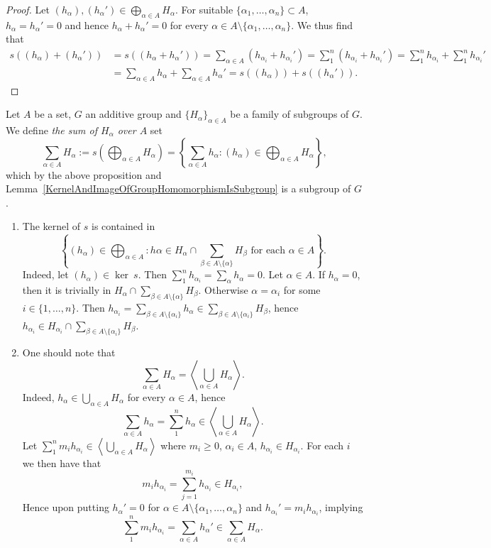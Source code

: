 \begin{proof}
    Let $(h_\alpha),(h_\alpha')\in \bigoplus_{\alpha\in A} H_\alpha$.
    For suitable $\{\alpha_1,\dots,\alpha_n\}\subset A$, $h_\alpha = h_\alpha'=0$ and hence $h_\alpha+h_\alpha' = 0$ for every $\alpha\in A\setminus \{\alpha_1,\dots,\alpha_n\}$. We thus find that
    \begin{align*}
        s((h_\alpha)+(h_\alpha')) &= s((h_\alpha+h_\alpha'))= \sum_{\alpha\in A}\left( h_{\alpha_i} + h_{\alpha_i}'\right) = \sum_1^n\left( h_{\alpha_i} + h_{\alpha_i}'\right)
        = \sum_1^n h_{\alpha_i} +\sum_1^n h_{\alpha_i}'\\
        &= \sum_{\alpha \in A} h_\alpha + \sum_{\alpha\in A} h_\alpha' = s((h_\alpha)) + s((h_\alpha')).
    \end{align*}
\end{proof}
\begin{definition}
    Let $A$ be a set, $G$ an additive group and $\{H_\alpha\}_{\alpha\in A}$ be a family of subgroups of $G$. We define \textit{the sum of $H_\alpha$ over $A$} set 
    $$\sum_{\alpha \in A} H_\alpha := s\left(\bigoplus_{\alpha\in A} H_\alpha\right) =  \left\{ \sum_{\alpha\in A} h_\alpha : (h_\alpha)\in \bigoplus_{\alpha\in A} H_\alpha \right\},$$
    which by the above proposition and Lemma~\ref{KernelAndImageOfGroupHomomorphismIsSubgroup} is a subgroup of $G$. 
\end{definition}
\begin{remark}\label{SumOfSubgroupsIsSubgroupGeneratedByUnion}
    \begin{enumerate}
    \item The kernel of $s$ is contained in 
    $$\left\{ (h_\alpha)\in \bigoplus_{\alpha\in A} : h\alpha \in H_\alpha \cap \sum_{\beta\in A\setminus\{\alpha\}} H_\beta \text{ for each } \alpha\in A\right\}.$$
    Indeed, let $(h_\alpha)\in \ker \ s$. Then $\sum_1^n h_{\alpha_i} = \sum_{\alpha} h_\alpha = 0$. Let $\alpha \in A$. If $h_\alpha =0$, then it is trivially in $H_\alpha \cap \sum_{\beta\in A\setminus\{\alpha\}} H_\beta$. Otherwise $\alpha = \alpha_i$ for some $i\in\{1,\dots,n\}$. Then $h_{\alpha_i}=\sum_{\beta\in A\setminus \{\alpha_i\}} h_\alpha \in \sum_{\beta\in A\setminus\{\alpha_i\}} H_\beta$, hence $h_{\alpha_i}\in H_{\alpha_i}\cap \sum_{\beta\in A\setminus\{\alpha_i\}} H_\beta$.
    \item One should note that $$\sum_{\alpha\in A} H_\alpha = \left\langle \bigcup_{\alpha\in A} H_\alpha \right\rangle.$$
    Indeed, $h_\alpha\in \bigcup_{\alpha\in A} H_\alpha$ for every $\alpha\in A$, hence 
    $$\sum_{\alpha\in A} h_\alpha = \sum_1^n h_\alpha \in \left\langle \bigcup_{\alpha\in A} H_\alpha \right\rangle.$$
    Let $\sum_1^n m_ih_{\alpha_i}\in \left\langle \bigcup_{\alpha\in A} H_\alpha \right\rangle$ where $m_i\geq 0$, $\alpha_i\in A$, $h_{\alpha_i}\in H_{\alpha_i}$. For each $i$ we then have that 
    $$m_ih_{\alpha_i} = \sum_{j=1}^{m_i} h_{\alpha_i}\in H_{\alpha_i},$$
    Hence upon putting $h_\alpha' = 0$ for $\alpha\in A\setminus\{\alpha_1,\dots,\alpha_n\}$ and $h_{\alpha_i}' = m_ih_{\alpha_i}$, implying 
    $$\sum_1^n m_ih_{\alpha_i} = \sum_{\alpha\in A} h_\alpha'\in \sum_{\alpha\in A} H_\alpha.$$
    \end{enumerate}
\end{remark}

